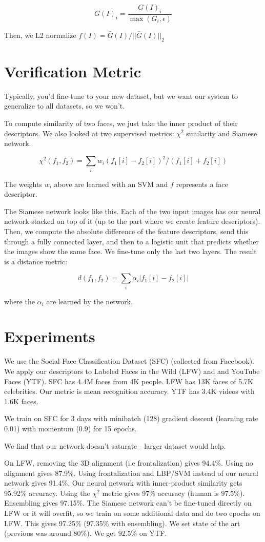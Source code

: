 \documentclass[a4paper]{article}
\begin{document}
$$
\bar{G}(I)_i = \frac{G(I)_i}{\max(G_i, \epsilon)}
$$

Then, we L2 normalize $f(I) = \bar{G}(I) / || \bar{G}(I) ||_2$

\section{Verification Metric}
Typically, you'd fine-tune to your new dataset, but we want our system to
generalize to all datasets, so we won't.

To compute similarity of two faces, we just take the inner product of their
descriptors. We also looked at two supervised metrics: $\chi^2$ similarity
and Siamese network.

$$
\chi^2(f_1, f_2) = \sum_{i}{w_i(f_1[i] - f_2[i])^2 / (f_1[i] + f_2[i])}
$$

The weights $w_i$ above are learned with an SVM and $f$ represents a face
descriptor.

The Siamese network looks like this. Each of the two input images has
our neural network stacked on top of it (up to the part where we create
feature descriptors). Then, we compute the absolute difference of the feature
descriptors, send this through a fully connected layer, and then to a logistic
unit that predicts whether the images show the same face. We fine-tune only
the last two layers. The result is a distance metric:

$$
d(f_1, f_2) = \sum_{i}{\alpha_i |f_1[i] - f_2[i]|}
$$

where the $\alpha_i$ are learned by the network.

\section{Experiments}
We use the Social Face Classification Dataset (SFC) (collected from Facebook).
We apply our descriptors to Labeled Faces in the Wild (LFW) and and YouTube 
Faces (YTF). SFC has 4.4M faces from 4K people. LFW has 13K faces of 5.7K
celebrities. Our metric is mean recognition accuracy. YTF has 3.4K videos
with 1.6K faces.

We train on SFC for 3 days with minibatch (128) gradient descent (learning
rate 0.01) with momentum (0.9) for 15 epochs.

We find that our network doesn't saturate - larger dataset would help.

On LFW, removing the 3D alignment (i.e frontalization) gives 94.4\%. Using
no alignment gives 87.9\%. Using frontalization and LBP/SVM instead of our
neural network gives 91.4\%. Our neural network with inner-product similarity
gets 95.92\% accuracy. Using the $\chi^2$ metric gives 97\% accuracy (human is
97.5\%). Ensembling gives 97.15\%. The Siamese network can't be fine-tuned
directly on LFW or it will overfit, so we train on some additional data and
do two epochs on LFW. This gives 97.25\% (97.35\% with ensembling). We
set state of the art (previous was around 80\%). We get 92.5\% on YTF.
\end{document}
